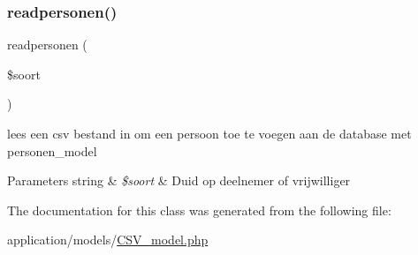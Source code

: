 \subsubsection{\texorpdfstring{readpersonen()}{readpersonen()}}
{\footnotesize\ttfamily readpersonen (\begin{DoxyParamCaption}\item[{}]{\$soort }\end{DoxyParamCaption})}

lees een csv bestand in om een persoon toe te voegen aan de database met personen\+\_\+model 
\begin{DoxyParams}[1]{Parameters}
string & {\em \$soort} & Duid op deelnemer of vrijwilliger \\
\hline
\end{DoxyParams}


The documentation for this class was generated from the following file\+:\begin{DoxyCompactItemize}
\item 
application/models/\mbox{\hyperlink{_c_s_v__model_8php}{C\+S\+V\+\_\+model.\+php}}\end{DoxyCompactItemize}
